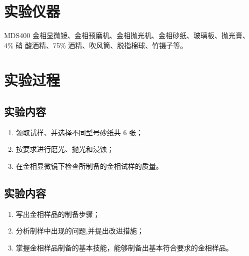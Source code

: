\documentclass[a4paper,utf8]{article}
\begin{document}
\section{实验仪器}%
    MDS400 金相显微镜、金相预磨机、金相抛光机、金相砂纸、玻璃板、抛光膏、4\% 硝
酸酒精、75\% 酒精、吹风筒、脱指棉球、竹镊子等。
\section{实验过程}%
    \subsection{实验内容}
        \begin{enumerate}
            \item 领取试样、并选择不同型号砂纸共 6 张；
            \item 按要求进行磨光、抛光和浸蚀；
            \item 在金相显微镜下检查所制备的金相试样的质量。
        \end{enumerate}
    \subsection{实验内容}
        \begin{enumerate}
            \item 写出金相样品的制备步骤；
            \item 分析制样中出现的问题,并提出改进措施；
            \item 掌握金相样品制备的基本技能，能够制备出基本符合要求的金相样品。
        \end{enumerate}
\end{document}
